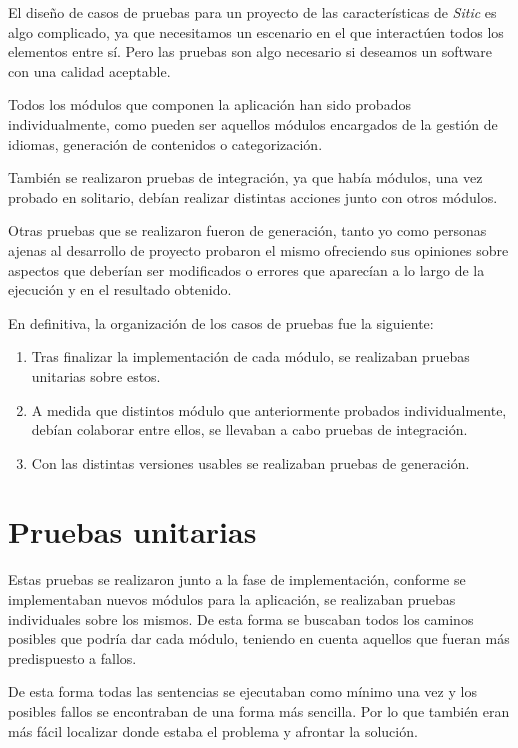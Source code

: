 El diseño de casos de pruebas para un proyecto de las características de \emph{Sitic}
es algo complicado, ya que necesitamos un escenario en el que interactúen todos los
elementos entre sí. Pero las pruebas son algo necesario si deseamos un software con una
calidad aceptable.

Todos los módulos que componen la aplicación han sido probados individualmente, como pueden
ser aquellos módulos encargados de la gestión de idiomas, generación de contenidos o categorización.

También se realizaron pruebas de integración, ya que había módulos, una vez probado en solitario,
debían realizar distintas acciones junto con otros módulos.

Otras pruebas que se realizaron fueron de generación, tanto yo como
personas ajenas al desarrollo de proyecto probaron el
mismo ofreciendo sus opiniones sobre aspectos que deberían ser modificados o
errores que aparecían a lo largo de la ejecución y en el resultado obtenido.

En definitiva, la organización de los casos de pruebas fue la siguiente:

\begin{enumerate}
    \item Tras finalizar la implementación de cada módulo, se realizaban pruebas unitarias sobre estos.
    \item A medida que distintos módulo que anteriormente probados individualmente, debían colaborar entre ellos, se
    llevaban a cabo pruebas de integración.
    \item Con las distintas versiones usables se realizaban pruebas de generación.
\end{enumerate}

\section{Pruebas unitarias}

Estas pruebas se realizaron junto a la fase de implementación, conforme se implementaban nuevos módulos para la aplicación,
se realizaban pruebas individuales sobre los mismos. De esta forma se buscaban todos los caminos posibles que podría dar cada
módulo, teniendo en cuenta aquellos que fueran más predispuesto a fallos.

De esta forma todas las sentencias se ejecutaban como mínimo una vez y los posibles fallos se encontraban de una forma más sencilla.
Por lo que también eran más fácil localizar donde estaba el problema y afrontar la solución.

